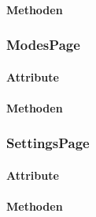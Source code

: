 \documentclass[../entwurf.tex]{subfiles}
\begin{document}
\paragraph{Methoden}
\subsubsection{ModesPage}
\paragraph{Attribute}
\paragraph{Methoden}
\subsubsection{SettingsPage}
\paragraph{Attribute}
\paragraph{Methoden}
\end{document}
